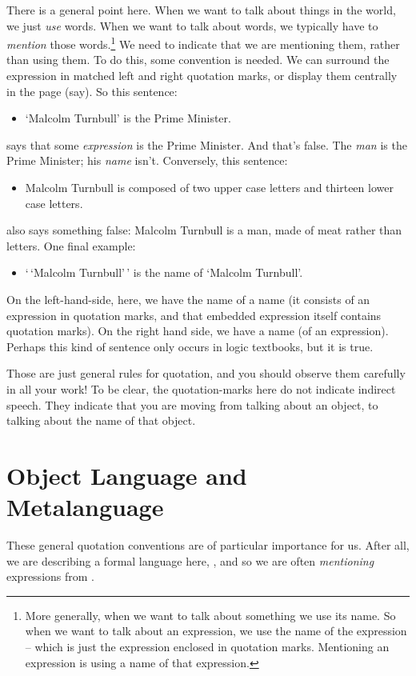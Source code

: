 There is a general point here. When we want to talk about things in the world, we just \emph{use} words. When we want to talk about words, we typically have to \emph{mention} those words.\footnote{More generally, when we want to talk about something we use its name. So when we want to talk about an expression, we use the name of the expression – which is just the expression enclosed in quotation marks. Mentioning an expression is using a name of that expression.} We need to indicate that we are mentioning them, rather than using them. To do this, some convention is needed. We can surround the expression in matched left and right quotation marks, or display them centrally in the page (say). So this sentence:
	\begin{itemize}
		\item `Malcolm Turnbull' is the Prime Minister.
	\end{itemize}
says that some \emph{expression} is the Prime Minister. And that's false. The \emph{man} is the Prime Minister; his \emph{name} isn't. Conversely, this sentence:
	\begin{itemize}
		\item Malcolm Turnbull is composed of two upper case letters and thirteen lower case letters.
	\end{itemize}
also says something false: Malcolm Turnbull is a man, made of meat rather than letters. One final example:
	\begin{itemize}
		\item `\,`Malcolm Turnbull'\,' is the name of `Malcolm Turnbull'.
	\end{itemize} 
On the left-hand-side, here, we have the name of a name (it consists of an expression in quotation marks, and that embedded expression itself contains quotation marks). On the right hand side, we have a name (of an expression). Perhaps this kind of sentence only occurs in logic textbooks, but it is true. 

Those are just general rules for quotation, and you should observe them carefully in all your work! To be clear, the quotation-marks here do not indicate indirect speech. They indicate that you are moving from talking about an object, to talking about the name of that object.


\section{Object Language and Metalanguage}
These general quotation conventions are of particular importance for us. After all, we are describing a formal language here, \TFL, and so we are often \emph{mentioning} expressions from \TFL. 

